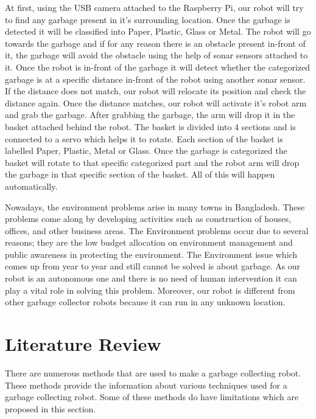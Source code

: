 \documentclass[conference]{IEEEtran}
\begin{document}
	At first, using the USB camera attached to the Raspberry Pi, our robot will try to find any garbage present in it's surrounding location. Once the garbage is detected it will be classified into Paper, Plastic, Glass or Metal. The robot will go towards the garbage and if for any reason there is an obstacle present in-front of it, the garbage will avoid the obstacle using the help of sonar sensors attached to it. Once the robot is in-front of the garbage it will detect whether the categorized garbage is at a specific distance in-front of the robot using another sonar sensor. If the distance does not match, our robot will relocate its position and check the distance again. Once the distance matches, our robot will activate it's robot arm and grab the garbage. After grabbing the garbage, the arm will drop it in the basket attached behind the robot. The basket is divided into 4 sections and is connected to a servo which helps it to rotate. Each section of the basket is labelled Paper, Plastic, Metal or Glass. Once the garbage is categorized the basket will rotate to that specific categorized part and the robot arm will drop the garbage in that specific section of the basket. All of this will happen automatically.
	
	Nowadays, the environment problems arise in many towns in Bangladesh. These problems come along by developing activities such as construction of houses, offices, and other business areas. The Environment problems occur due to several reasons; they are the low budget allocation on
	environment management and public awareness in protecting the environment. The Environment issue which comes up from year to year and still cannot be solved is about garbage. As our robot is an autonomous one and there is no need of human intervention it can play a vital role in solving this problem. Moreover, our robot is different from other garbage collector robots because it can run in any unknown location.
	
	\section{Literature Review}
	
	There are numerous methods that are used to make a garbage collecting robot. These methods provide the information about various techniques used for a garbage collecting robot. Some of these methods do have limitations which are proposed in this section.
	
\end{document}
